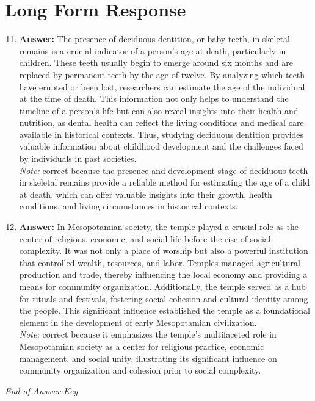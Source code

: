 \documentclass[12pt]{article}
\begin{document}
\section*{Long Form Response}
\begin{enumerate}[label=\arabic*.]
\setcounter{enumi}{10}
\item \textbf{Answer:} The presence of deciduous dentition, or baby teeth, in skeletal remains is a crucial indicator of a person's age at death, particularly in children. These teeth usually begin to emerge around six months and are replaced by permanent teeth by the age of twelve. By analyzing which teeth have erupted or been lost, researchers can estimate the age of the individual at the time of death. This information not only helps to understand the timeline of a person's life but can also reveal insights into their health and nutrition, as dental health can reflect the living conditions and medical care available in historical contexts. Thus, studying deciduous dentition provides valuable information about childhood development and the challenges faced by individuals in past societies.
\\ \textit{Note:} correct because the presence and development stage of deciduous teeth in skeletal remains provide a reliable method for estimating the age of a child at death, which can offer valuable insights into their growth, health conditions, and living circumstances in historical contexts.
\item \textbf{Answer:} In Mesopotamian society, the temple played a crucial role as the center of religious, economic, and social life before the rise of social complexity. It was not only a place of worship but also a powerful institution that controlled wealth, resources, and labor. Temples managed agricultural production and trade, thereby influencing the local economy and providing a means for community organization. Additionally, the temple served as a hub for rituals and festivals, fostering social cohesion and cultural identity among the people. This significant influence established the temple as a foundational element in the development of early Mesopotamian civilization.
\\ \textit{Note:} correct because it emphasizes the temple's multifaceted role in Mesopotamian society as a center for religious practice, economic management, and social unity, illustrating its significant influence on community organization and cohesion prior to social complexity.
\end{enumerate}

\vfill
\noindent\textit{End of Answer Key}
\end{document}
